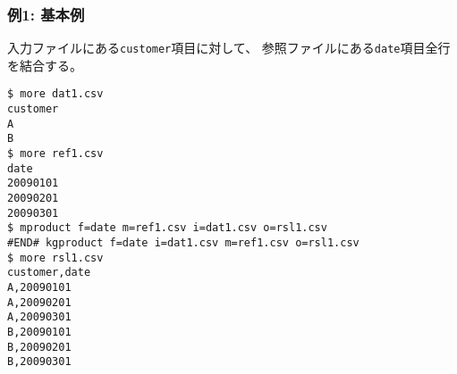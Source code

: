 \subsubsection*{例1: 基本例}

入力ファイルにある\verb|customer|項目に対して、
参照ファイルにある\verb|date|項目全行を結合する。


\begin{Verbatim}[baselinestretch=0.7,frame=single]
$ more dat1.csv
customer
A
B
$ more ref1.csv
date
20090101
20090201
20090301
$ mproduct f=date m=ref1.csv i=dat1.csv o=rsl1.csv
#END# kgproduct f=date i=dat1.csv m=ref1.csv o=rsl1.csv
$ more rsl1.csv
customer,date
A,20090101
A,20090201
A,20090301
B,20090101
B,20090201
B,20090301
\end{Verbatim}
